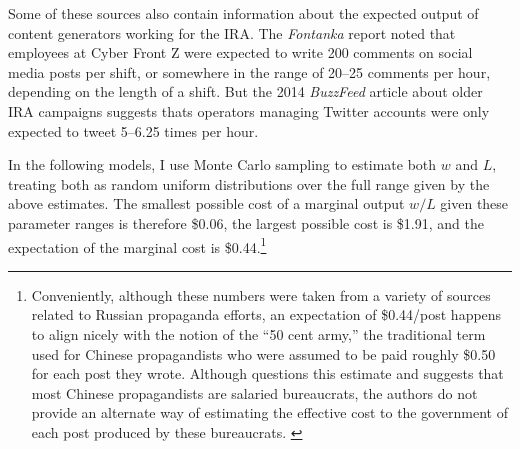 \documentclass{article}
\begin{document}
Some of these sources also contain information about the expected output of content generators working for the IRA. The \textit{Fontanka} report noted that employees at Cyber Front Z were expected to write 200 comments on social media posts per shift, or somewhere in the range of 20–25 comments per hour, depending on the length of a shift. But the 2014 \textit{BuzzFeed} article about older IRA campaigns suggests thats operators managing Twitter accounts were only expected to tweet 5–6.25 times per hour.   

In the following models, I use Monte Carlo sampling to estimate both $w$ and $L$, treating both as random uniform distributions over the full range given by the above estimates. The smallest possible cost of a marginal output $w/L$ given these parameter ranges is therefore \$0.06, the largest possible cost is \$1.91, and the expectation of the marginal cost is \$0.44.\footnote{Conveniently, although these numbers were taken from a variety of sources related to Russian propaganda efforts, an expectation of \$0.44/post happens to align nicely with the notion of the ``50 cent army,'' the traditional term used for Chinese propagandists who were assumed to be paid roughly \$0.50 for each post they wrote. Although \cite{king} questions this estimate and suggests that most Chinese propagandists are salaried bureaucrats, the authors do not provide an alternate way of estimating the effective cost to the government of each post produced by these bureaucrats. \label{50cent}}
\end{document}
